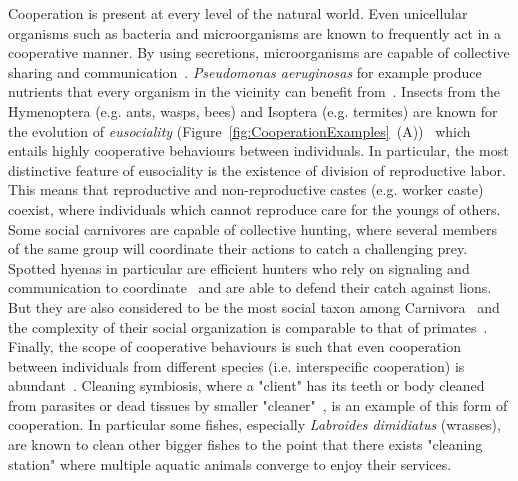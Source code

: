     Cooperation is present at every level of the natural world. Even unicellular organisms such as bacteria and microorganisms are known to frequently act in a cooperative manner. By using secretions, microorganisms are capable of collective sharing and communication~\parencite{Elena2003, Keller2006, West2006}. \emph{Pseudomonas aeruginosas} for example produce nutrients that every organism in the vicinity can benefit from~\parencite{Popat2012, Harrison2013}. Insects from the Hymenoptera (e.g. ants, wasps, bees) and Isoptera (e.g. termites) are known for the evolution of \emph{eusociality} (Figure~\ref{fig:CooperationExamples}~(A))~\parencite{Wilson1990} which entails highly cooperative behaviours between individuals. In particular, the most distinctive feature of eusociality is the existence of division of reproductive labor. This means that reproductive and non-reproductive castes (e.g. worker caste) coexist, where individuals which cannot reproduce care for the youngs of others. Some social carnivores are capable of collective hunting, where several members of the same group will coordinate their actions to catch a challenging prey. Spotted hyenas in particular are efficient hunters who rely on signaling and communication to coordinate~\parencite{Drea2009a, Smith2010, Smith2012a} and are able to defend their catch against lions. But they are also considered to be the most social taxon among Carnivora~\parencite{Mills2003} and the complexity of their social organization is comparable to that of primates~\parencite{Drea2003}. Finally, the scope of cooperative behaviours is such that even cooperation between individuals from different species (i.e. interspecific cooperation) is abundant~\parencite{Bshary2004}. Cleaning symbiosis, where a "client" has its teeth or body cleaned from parasites or dead tissues by smaller "cleaner"~\parencite{Poulin1996}, is an example of this form of cooperation. In particular some fishes, especially \emph{Labroides dimidiatus} (wrasses), are known to clean other bigger fishes to the point that there exists "cleaning station" where multiple aquatic animals converge to enjoy their services.


